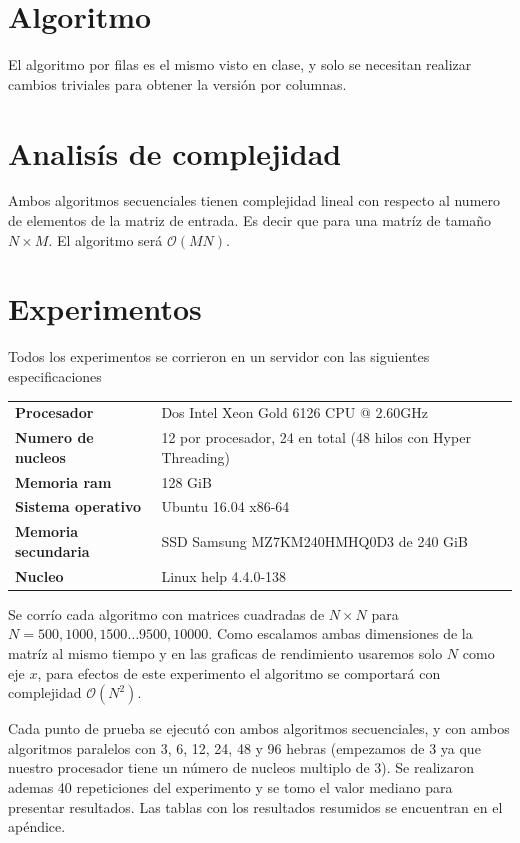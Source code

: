 \documentclass{report}
\begin{document}
\section{Algoritmo}

El algoritmo por filas es el mismo visto en clase, y solo se necesitan
realizar cambios triviales para obtener la versión por columnas.

\section{Analis\'is de complejidad}

Ambos algoritmos secuenciales tienen complejidad lineal con respecto al numero
de elementos de la matriz de entrada. Es decir que para una matr\'iz de tamaño
$N \times M$. El algoritmo ser\'a $\mathcal{O}(MN)$.

\section{Experimentos}

Todos los experimentos se corrieron en un servidor con las siguientes
especificaciones

\begin{table}[H]
  \begin{tabular}{ >{\bf}l l }
  Procesador & Dos Intel Xeon Gold 6126 CPU @ 2.60GHz \\
  Numero de nucleos & 12 por procesador, 24 en total (48 hilos con Hyper Threading) \\
  Memoria ram & 128 GiB \\
  Sistema operativo & Ubuntu 16.04 x86-64 \\
  Memoria secundaria & SSD Samsung MZ7KM240HMHQ0D3 de 240 GiB\\
  Nucleo & Linux help 4.4.0-138
\end{tabular}
\end{table}

Se corr\'io cada algoritmo con matrices cuadradas de $N \times N$  para 
$N = 500, 1000, 1500 \ldots 9500, 10000 $. Como escalamos ambas
dimensiones de la matr\'iz al mismo tiempo y en las graficas de
rendimiento usaremos solo $N$ como eje $x$, para efectos de este experimento
el algoritmo se comportar\'a con complejidad $\mathcal{O}(N^2)$.

Cada punto de prueba se ejecut\'o con ambos algoritmos secuenciales, y
con ambos algoritmos paralelos con 3, 6, 12, 24, 48 y 96 hebras (empezamos de
3 ya que nuestro procesador tiene un n\'umero de nucleos multiplo de 3). Se
realizaron ademas 40 repeticiones del experimento y se tomo el valor mediano
para presentar resultados. Las tablas con los resultados resumidos se encuentran
en el ap\'endice.
\end{document}
